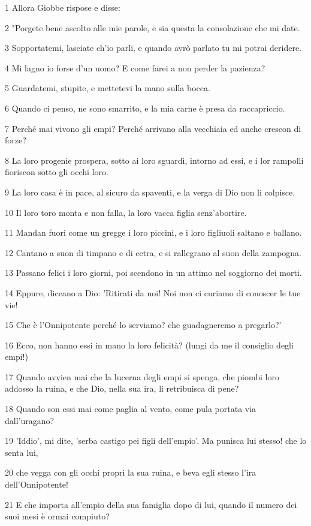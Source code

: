 \par 1 Allora Giobbe rispose e disse:
\par 2 "Porgete bene ascolto alle mie parole, e sia questa la consolazione che mi date.
\par 3 Sopportatemi, lasciate ch'io parli, e quando avrò parlato tu mi potrai deridere.
\par 4 Mi lagno io forse d'un uomo? E come farei a non perder la pazienza?
\par 5 Guardatemi, stupite, e mettetevi la mano sulla bocca.
\par 6 Quando ci penso, ne sono smarrito, e la mia carne è presa da raccapriccio.
\par 7 Perché mai vivono gli empi? Perché arrivano alla vecchiaia ed anche crescon di forze?
\par 8 La loro progenie prospera, sotto ai loro sguardi, intorno ad essi, e i lor rampolli fioriscon sotto gli occhi loro.
\par 9 La loro casa è in pace, al sicuro da spaventi, e la verga di Dio non li colpisce.
\par 10 Il loro toro monta e non falla, la loro vacca figlia senz'abortire.
\par 11 Mandan fuori come un gregge i loro piccini, e i loro figliuoli saltano e ballano.
\par 12 Cantano a suon di timpano e di cetra, e si rallegrano al suon della zampogna.
\par 13 Passano felici i loro giorni, poi scendono in un attimo nel soggiorno dei morti.
\par 14 Eppure, diceano a Dio: 'Ritirati da noi! Noi non ci curiamo di conoscer le tue vie!
\par 15 Che è l'Onnipotente perché lo serviamo? che guadagneremo a pregarlo?'
\par 16 Ecco, non hanno essi in mano la loro felicità? (lungi da me il consiglio degli empi!)
\par 17 Quando avvien mai che la lucerna degli empi si spenga, che piombi loro addosso la ruina, e che Dio, nella sua ira, li retribuisca di pene?
\par 18 Quando son essi mai come paglia al vento, come pula portata via dall'uragano?
\par 19 'Iddio', mi dite, 'serba castigo pei figli dell'empio'. Ma punisca lui stesso! che lo senta lui,
\par 20 che vegga con gli occhi propri la sua ruina, e beva egli stesso l'ira dell'Onnipotente!
\par 21 E che importa all'empio della sua famiglia dopo di lui, quando il numero dei suoi mesi è ormai compiuto?
